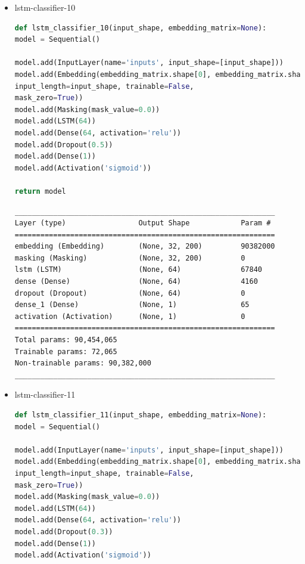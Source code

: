 \documentclass{article}
\begin{document}
\begin{itemize}
\item lstm-classifier-10

\begin{lstlisting}[language=Python, caption=Дефиниция на lstm-classifier-10.]
def lstm_classifier_10(input_shape, embedding_matrix=None):
model = Sequential()

model.add(InputLayer(name='inputs', input_shape=[input_shape]))
model.add(Embedding(embedding_matrix.shape[0], embedding_matrix.shape[1], weights=[embedding_matrix],
input_length=input_shape, trainable=False,
mask_zero=True))
model.add(Masking(mask_value=0.0))
model.add(LSTM(64))
model.add(Dense(64, activation='relu'))
model.add(Dropout(0.5))
model.add(Dense(1))
model.add(Activation('sigmoid'))

return model
\end{lstlisting}

\begin{lstlisting}[numbers=none, caption=Обобщение на lstm-classifier-10.]
_____________________________________________________________
Layer (type)                 Output Shape            Param #
=============================================================
embedding (Embedding)        (None, 32, 200)         90382000
masking (Masking)            (None, 32, 200)         0
lstm (LSTM)                  (None, 64)              67840
dense (Dense)                (None, 64)              4160
dropout (Dropout)            (None, 64)              0
dense_1 (Dense)              (None, 1)               65
activation (Activation)      (None, 1)               0
=============================================================
Total params: 90,454,065
Trainable params: 72,065
Non-trainable params: 90,382,000
_____________________________________________________________
\end{lstlisting}

\item lstm-classifier-11

\begin{lstlisting}[language=Python, caption=Дефиниция на lstm-classifier-11.]
def lstm_classifier_11(input_shape, embedding_matrix=None):
model = Sequential()

model.add(InputLayer(name='inputs', input_shape=[input_shape]))
model.add(Embedding(embedding_matrix.shape[0], embedding_matrix.shape[1], weights=[embedding_matrix],
input_length=input_shape, trainable=False,
mask_zero=True))
model.add(Masking(mask_value=0.0))
model.add(LSTM(64))
model.add(Dense(64, activation='relu'))
model.add(Dropout(0.3))
model.add(Dense(1))
model.add(Activation('sigmoid'))


\end{lstlisting}
\end{itemize}
\end{document}
